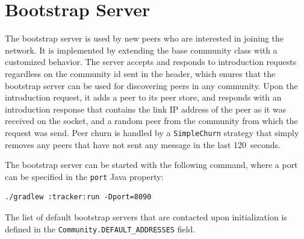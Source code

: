 




\section{Bootstrap Server}

The bootstrap server is used by new peers who are interested in joining the network. It is implemented by extending the base community class with a customized behavior. The server accepts and responds to introduction requests regardless on the community id sent in the header, which enures that the bootstrap server can be used for discovering peers in any community. Upon the introduction request, it adds a peer to its peer store, and responds with an introduction response that contains the link IP address of the peer as it was received on the socket, and a random peer from the community from which the request was send. Peer churn is handled by a \texttt{SimpleChurn} strategy that simply removes any peers that have not sent any message in the last 120~seconds.

The bootstrap server can be started with the following command, where a port can be specified in the \texttt{port} Java property:

\begin{verbatim}
./gradlew :tracker:run -Dport=8090
\end{verbatim}

The list of default bootstrap servers that are contacted upon initialization is defined in the \texttt{Community.DEFAULT\_ADDRESSES} field.

